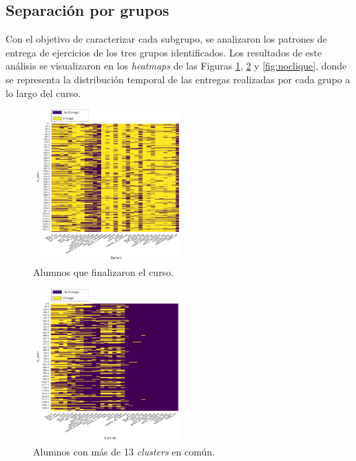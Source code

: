 \documentclass[11pt,a4paper,twoside,openany]{tesis}
\begin{document}
\subsection{Separación por grupos}\textbf{ }

Con el objetivo de caracterizar cada subgrupo, se analizaron los patrones de entrega de ejercicios de los tres grupos identificados. Los resultados de este análisis se visualizaron en los \emph{heatmaps} de las Figuras \ref{fig:final}, \ref{fig:clique} y \ref{fig:noclique}, donde se representa la distribución temporal de las entregas realizadas por cada grupo a lo largo del curso.

\begin{figure}[H]
\centering
\includegraphics[width=0.5\textwidth]{imagenes/entregas - finalizados.png}
\caption{Alumnos que finalizaron el curso.}
\label{fig:final}
\end{figure}

\begin{figure}[H]
\centering
\includegraphics[width=0.5\textwidth]{imagenes/entregas - clique13.png}
\caption{Alumnos con más de 13 \emph{clusters} en común.}
\label{fig:clique}
\end{figure}
\end{document}
